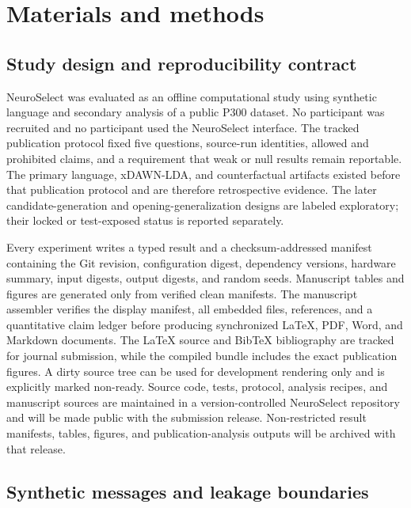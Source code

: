 \documentclass[11pt]{article}
\begin{document}
\section{Materials and methods}

\subsection{Study design and reproducibility contract}

NeuroSelect was evaluated as an offline computational study using synthetic language and secondary analysis of a public P300 dataset. No participant was recruited and no participant used the NeuroSelect interface. The tracked publication protocol fixed five questions, source-run identities, allowed and prohibited claims, and a requirement that weak or null results remain reportable. The primary language, xDAWN-LDA, and counterfactual artifacts existed before that publication protocol and are therefore retrospective evidence. The later candidate-generation and opening-generalization designs are labeled exploratory; their locked or test-exposed status is reported separately.


Every experiment writes a typed result and a checksum-addressed manifest containing the Git revision, configuration digest, dependency versions, hardware summary, input digests, output digests, and random seeds. Manuscript tables and figures are generated only from verified clean manifests. The manuscript assembler verifies the display manifest, all embedded files, references, and a quantitative claim ledger before producing synchronized LaTeX, PDF, Word, and Markdown documents. The LaTeX source and BibTeX bibliography are tracked for journal submission, while the compiled bundle includes the exact publication figures. A dirty source tree can be used for development rendering only and is explicitly marked non-ready. Source code, tests, protocol, analysis recipes, and manuscript sources are maintained in a version-controlled NeuroSelect repository and will be made public with the submission release. Non-restricted result manifests, tables, figures, and publication-analysis outputs will be archived with that release.


\subsection{Synthetic messages and leakage boundaries}
\end{document}

